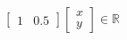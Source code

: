 \documentclass[preview]{standalone}
\begin{document}
\begin{align*}
\begin{bmatrix}1&0.5\end{bmatrix} \begin{bmatrix}x\\y\end{bmatrix} \in \mathbb{R}
\end{align*}
\end{document}
